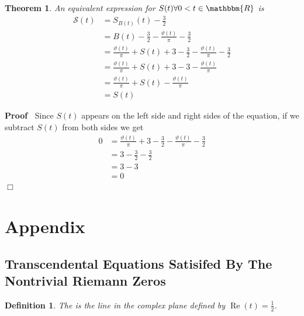 \documentclass{article}
\newcommand{\tmop}[1]{\ensuremath{\operatorname{#1}}}
\newcommand{\tmverbatim}[1]{{\ttfamily{#1}}}
\newenvironment{proof}{\noindent\textbf{Proof\ }}{\hspace*{\fill}$\Box$\medskip}
\newtheorem{definition}{Definition}
\newtheorem{theorem}{Theorem}
\begin{document}
\begin{theorem}
  An equivalent expression for $S (t) \forall 0 < t \in \mathbbm{R}$ is
  \begin{equation}
    \begin{array}{cl}
      \mathcal{S} (t) & = S_{B (t)} (t) - \frac{3}{2}\\
      & = B (t) - \frac{3}{2} - \frac{\vartheta (t)}{\pi} - \frac{3}{2}\\
      & = \frac{\vartheta (t)}{\pi} + S (t) + 3 - \frac{3}{2} -
      \frac{\vartheta (t)}{\pi} - \frac{3}{2}\\
      & = \frac{\vartheta (t)}{\pi} + S (t) + 3 - 3 - \frac{\vartheta
      (t)}{\pi}\\
      & = \frac{\vartheta (t)}{\pi} + S (t) - \frac{\vartheta (t)}{\pi}\\
      & = S (t)
    \end{array}
  \end{equation}
\end{theorem}

\begin{proof}
  Since $S (t)$ appears on the left side and right sides of the equation, if
  we subtract $S (t)$ from both sides we get
  \begin{equation}
    \begin{array}{ll}
      0 & = \frac{\vartheta (t)}{\pi} + 3 - \frac{3}{2} - \frac{\vartheta
      (t)}{\pi} - \frac{3}{2}\\
      & = 3 - \frac{3}{2} - \frac{3}{2}\\
      & = 3 - 3\\
      & = 0
    \end{array}
  \end{equation}
\end{proof}

\section{Appendix}

\subsection{Transcendental Equations Satisifed By The Nontrivial Riemann
Zeros}

\begin{definition}
  The \tmverbatim{critical line} is the line in the complex plane defined by
  $\tmop{Re} (t) = \frac{1}{2}$.
\end{definition}
\end{document}
